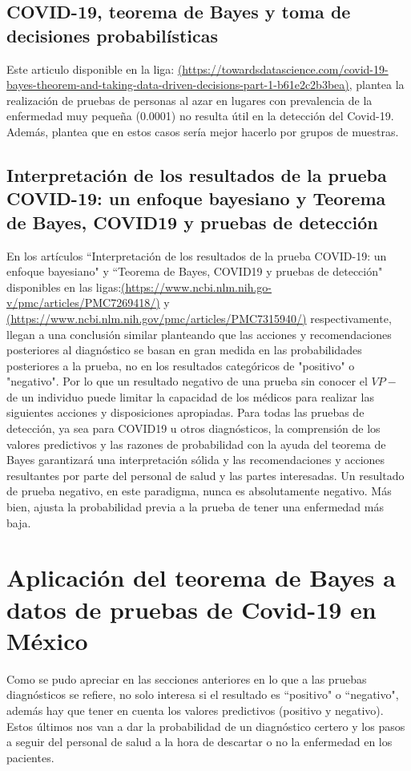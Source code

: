 \documentclass{article}
\begin{document}
\subsection{COVID-19, teorema de Bayes y toma de decisiones probabilísticas}
Este articulo disponible en la liga: \href{https://towardsdatascience.com/covid-19-bayes-theorem-and-taking-data-driven-decisions-part-1-b61e2c2b3bea}{(https://towardsdatascience.com/covid-19-bayes-theorem-and-taking-data-driven-decisions-part-1-b61e2c2b3bea)}, plantea la realización de pruebas de personas al azar en lugares con prevalencia de la enfermedad muy pequeña (0.0001) no resulta útil en la detección del Covid-19. Además, plantea que en estos casos sería mejor hacerlo por grupos de muestras.
\subsection{Interpretación de los resultados de la prueba COVID-19: un enfoque bayesiano y Teorema de Bayes, COVID19 y pruebas de detección} 
En los artículos ``Interpretación de los resultados de la prueba COVID-19: un enfoque bayesiano" y ``Teorema de Bayes, COVID19 y pruebas de detección" disponibles en las ligas:\href{https://www.ncbi.nlm.nih.gov/pmc/articles/PMC7269418/}{(https://www.ncbi.nlm.nih.go-
v/pmc/articles/PMC7269418/)} y \href{https://www.ncbi.nlm.nih.gov/pmc/articles/PMC7315940/}{(https://www.ncbi.nlm.nih.gov/pmc/articles/PMC7315940/)} respectivamente, llegan a una conclusión similar planteando que las acciones y recomendaciones posteriores al diagnóstico se basan en gran medida en las probabilidades posteriores a la prueba, no en los resultados categóricos de "positivo" o "negativo". Por lo que un resultado negativo de una prueba sin conocer el $VP-$ de un individuo puede limitar la capacidad de los médicos para realizar las siguientes acciones y disposiciones apropiadas. Para todas las pruebas de detección, ya sea para COVID19 u otros diagnósticos, la comprensión de los valores predictivos y las razones de probabilidad con la ayuda del teorema de Bayes garantizará una interpretación sólida y las recomendaciones y acciones resultantes por parte del personal de salud y las partes interesadas. Un resultado de prueba negativo, en este paradigma, nunca es absolutamente negativo. Más bien, ajusta la probabilidad previa a la prueba de tener una enfermedad más baja. 

\section{Aplicación del teorema de Bayes a datos de pruebas de Covid-19 en México}
Como se pudo apreciar en las secciones anteriores en lo que a las pruebas diagnósticos se refiere, no solo interesa si el resultado es ``positivo" o ``negativo", además hay que tener en cuenta los valores predictivos (positivo y negativo). Estos últimos nos van a dar la probabilidad de un diagnóstico certero y los pasos a seguir del personal de salud a la hora de descartar o no la enfermedad en los pacientes. 
\end{document}
